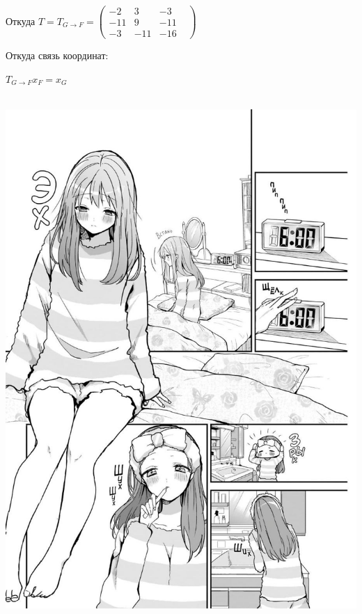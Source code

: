 \documentclass{article}
\begin{document}
Откуда $T = T_{G \rightarrow F} = \begin{pmatrix}
    -2 & 3 & -3\\
    -11 & 9 & -11\\
    -3 & -11 & -16&
\end{pmatrix}$

Откуда связь координат:

$T_{G \rightarrow F} x_F = x_G$




\begin{center}
   \includegraphics[width=14cm, height=20cm]{аниме2.jpg}
\end{center}
\end{document}
